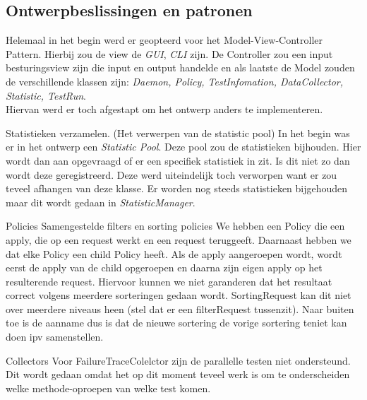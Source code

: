 \documentclass[i1]{oss}
\begin{document}
\subsection{Ontwerpbeslissingen en patronen}
\label{ssec:Ontwerpbeslissingen}

Helemaal in het begin werd er geopteerd voor het Model-View-Controller Pattern. Hierbij zou de view de \textit{GUI}, \textit{CLI} zijn. De Controller zou een input besturingsview zijn die input en output handelde en als laatste de Model zouden de verschillende klassen zijn: \textit{Daemon, Policy, TestInfomation, DataCollector, Statistic, TestRun}. \\

Hiervan werd er toch afgestapt om het ontwerp anders te implementeren. \\


\begin{description}
\item Statistieken verzamelen. (Het verwerpen van de statistic pool)
In het begin was er in het ontwerp een \textit{Statistic Pool}. Deze pool zou de statistieken bijhouden. Hier wordt dan aan opgevraagd of er een specifiek statistiek in zit. Is dit niet zo dan wordt deze geregistreerd. Deze werd uiteindelijk toch verworpen want er zou teveel afhangen van deze klasse. Er worden nog steeds statistieken bijgehouden maar dit wordt gedaan in \textit{StatisticManager}.

\item Policies
Samengestelde filters en sorting policies
We hebben een Policy die een apply, die op een request werkt en een request teruggeeft. Daarnaast hebben we dat elke Policy een child Policy heeft. Als de apply aangeroepen wordt, wordt eerst de apply van de child opgeroepen en daarna zijn eigen apply op het resulterende request. Hiervoor kunnen we niet garanderen dat het resultaat correct volgens meerdere sorteringen gedaan wordt. SortingRequest kan dit niet over meerdere niveaus heen (stel dat er een filterRequest tussenzit). Naar buiten toe is de aanname dus is dat de nieuwe sortering de vorige sortering teniet kan doen ipv samenstellen.

\item Collectors
Voor FailureTraceColelctor zijn de parallelle testen niet ondersteund. Dit wordt gedaan omdat het op dit moment teveel werk is om te onderscheiden welke methode-oproepen van welke test komen.
\end{description}
\end{document}
